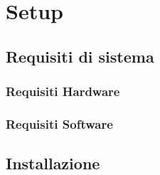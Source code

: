 \section{Setup}



\subsection{Requisiti di sistema}



\subsubsection{Requisiti Hardware}


\subsubsection{Requisiti Software}







\subsection{Installazione}




